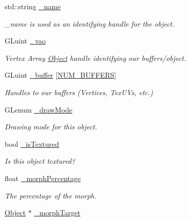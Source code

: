 \begin{DoxyCompactItemize}
\item 
std\-::string \hyperlink{class_object_a3f617214b260ebbe394e7c7b08ab5e43}{\-\_\-name}
\begin{DoxyCompactList}\small\item\em \-\_\-name is used as an identifying handle for the object. \end{DoxyCompactList}\item 
G\-Luint \hyperlink{class_object_a564aa6b1df66a05ab6b6c2f071851c4e}{\-\_\-vao}
\begin{DoxyCompactList}\small\item\em Vertex Array \hyperlink{class_object}{Object} handle identifying our buffers/object. \end{DoxyCompactList}\item 
\hypertarget{class_object_adf8365e2c661ab4014c3dbf60e48572b}{G\-Luint \hyperlink{class_object_adf8365e2c661ab4014c3dbf60e48572b}{\-\_\-buffer} \mbox{[}\hyperlink{class_object_a51d08da3bd559d08734197006bc29a79a1999a38dc687c7ae05c884078de39b51}{N\-U\-M\-\_\-\-B\-U\-F\-F\-E\-R\-S}\mbox{]}}\label{class_object_adf8365e2c661ab4014c3dbf60e48572b}

\begin{DoxyCompactList}\small\item\em Handles to our buffers (Vertices, Tex\-U\-Vs, etc.) \end{DoxyCompactList}\item 
G\-Lenum \hyperlink{class_object_ae8457eabfb89d55826142508013b56c0}{\-\_\-draw\-Mode}
\begin{DoxyCompactList}\small\item\em Drawing mode for this object. \end{DoxyCompactList}\item 
\hypertarget{class_object_abcb877094b696561a49bc931c5a12d9f}{bool \hyperlink{class_object_abcb877094b696561a49bc931c5a12d9f}{\-\_\-is\-Textured}}\label{class_object_abcb877094b696561a49bc931c5a12d9f}

\begin{DoxyCompactList}\small\item\em Is this object textured? \end{DoxyCompactList}\item 
float \hyperlink{class_object_a7fbbac9027e1a8266342bd5ce064120d}{\-\_\-morph\-Percentage}
\begin{DoxyCompactList}\small\item\em The percentage of the morph. \end{DoxyCompactList}\item 
\hypertarget{class_object_a5baa9891bd4981d62b4e86a1c2a8eea7}{\hyperlink{class_object}{Object} $\ast$ \hyperlink{class_object_a5baa9891bd4981d62b4e86a1c2a8eea7}{\-\_\-morph\-Target}}\label{class_object_a5baa9891bd4981d62b4e86a1c2a8eea7}


\end{DoxyCompactItemize}
